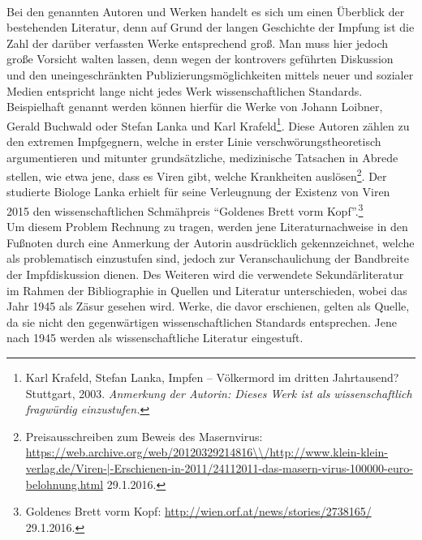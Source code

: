 \documentclass[
    a4paper,
    12pt,
    hyphens,
    chapterprefix=true,
    headheight=33pt,
    footheight=29pt,
    headings=optiontohead, %
]{scrartcl}
\begin{document}
\\
Bei den genannten Autoren und Werken handelt es sich um einen Überblick der bestehenden Literatur, denn auf Grund der langen Geschichte der Impfung ist die Zahl der darüber verfassten Werke entsprechend groß. Man muss hier jedoch große Vorsicht walten lassen, denn wegen der kontrovers geführten Diskussion und den uneingeschränkten Publizierungsmöglichkeiten mittels neuer und sozialer Medien entspricht lange nicht jedes Werk wissenschaftlichen Standards. Beispielhaft genannt werden können hierfür die Werke von Johann Loibner, Gerald Buchwald oder Stefan Lanka und Karl Krafeld\footnote{Karl Krafeld, Stefan Lanka, Impfen -- Völkermord im dritten Jahrtausend? Stuttgart, 2003. \textit{Anmerkung der Autorin: Dieses Werk ist als wissenschaftlich fragwürdig einzustufen.}}. Diese Autoren zählen zu den extremen Impfgegnern, welche in erster Linie verschwörungstheoretisch argumentieren und mitunter grundsätzliche, medizinische Tatsachen in Abrede stellen, wie etwa jene, dass es Viren gibt, welche Krankheiten auslösen\footnote{Preisausschreiben zum Beweis des Masernvirus: \url{https://web.archive.org/web/20120329214816\\/http://www.klein-klein-verlag.de/Viren-|-Erschienen-in-2011/24112011-das-masern-virus-100000-euro-belohnung.html} 29.1.2016.}. Der studierte Biologe Lanka erhielt für seine Verleugnung der Existenz von Viren 2015 den wissenschaftlichen Schmähpreis "`Goldenes Brett vorm Kopf"'.\footnote{Goldenes Brett vorm Kopf: \url{http://wien.orf.at/news/stories/2738165/} 29.1.2016.}\\
Um diesem Problem Rechnung zu tragen, werden jene Literaturnachweise in den Fußnoten durch eine Anmerkung der Autorin ausdrücklich gekennzeichnet, welche als problematisch einzustufen sind, jedoch zur Veranschaulichung der Bandbreite der Impfdiskussion dienen. Des Weiteren wird die verwendete Sekundärliteratur im Rahmen der Bibliographie in Quellen und Literatur unterschieden, wobei das Jahr 1945 als Zäsur gesehen wird. Werke, die davor erschienen, gelten als Quelle, da sie nicht den gegenwärtigen wissenschaftlichen Standards entsprechen. Jene nach 1945 werden als wissenschaftliche Literatur eingestuft.\\
\end{document}
